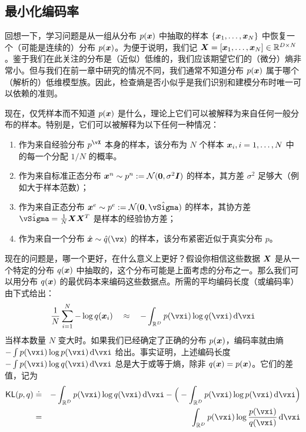 \documentclass[../../book-main.tex]{subfiles}
\begin{document}
\subsection{最小化编码率}\label{sub:min_entropy}
回想一下，学习问题是从一组从分布 $p(\bm{x})$ 中抽取的样本 $\{\bm{x}_1, \ldots, \bm{x}_N\}$ 中恢复一个（可能是连续的）分布 $p(\bm{x})$。为便于说明，我们记 $\bm{X} = [\bm{x}_1, \ldots, \bm{x}_N] \in \mathbb{R}^{D\times N}$。鉴于我们在此关注的分布是（近似）低维的，我们应该期望它们的（微分）熵非常小。但与我们在前一章中研究的情况不同，我们通常不知道分布 $p(\bm{x})$ 属于哪个（解析的）低维模型族。因此，检查熵是否小似乎是我们识别和建模分布时唯一可以依赖的准则。

现在，仅凭样本而不知道 $p(\bm{x})$ 是什么，理论上它们可以被解释为来自任何一般分布的样本。特别是，它们可以被解释为以下任何一种情况：
\begin{enumerate}
	\item 作为来自经验分布 $p^{\vX}$ 本身的样本，该分布为 $N$ 个样本 $\bm{x}_i, i=1, \ldots, N$ 中的每一个分配 $1/N$ 的概率。
	\item 作为来自标准正态分布 $\bm{x}^n \sim p^{n} := \mathcal{N}(\boldsymbol{0}, \sigma^2 \boldsymbol{I})$ 的样本，其方差 $\sigma^2$ 足够大（例如大于样本范数）；
	\item 作为来自正态分布 $\x^e \sim p^{e} := \mathcal{N}(\boldsymbol{0}, \hat{\vSigma})$ 的样本，其协方差 $\hat{\vSigma} = \frac{1}{N} \X \X^T$ 是样本的经验协方差；
	\item 作为来自一个分布 $\hat \x \sim \hat{q}(\vx)$ 的样本，该分布紧密近似于真实分布 $p$。
\end{enumerate}
现在的问题是，哪一个更好，在什么意义上更好？假设你相信这些数据 $\bm{X}$ 是从一个特定的分布 $q(\bm{x})$ 中抽取的，这个分布可能是上面考虑的分布之一。那么我们可以用分布 $q(\bm{x})$ 的最优码本来编码这些数据点。所需的平均编码长度（或编码率）由下式给出：
\begin{equation}
	\frac{1}{N}\sum_{i=1}^N -\log q(\x_i) \quad \approx \quad - \int_{\R^{D}} p(\vxi) \log q(\vxi)\odif{\vxi}
\end{equation}
当样本数量 $N$ 变大时。如果我们已经确定了正确的分布 $p(\bm{x})$，编码率就由熵 $- \int p(\vxi) \log p(\vxi) \odif{\vxi}$ 给出。事实证明，上述编码长度 $- \int p(\vxi) \log q(\vxi) \odif{\vxi}$ 总是大于或等于熵，除非 $q(\bm{x}) = p(\bm{x})$。它们的差值，记为
\begin{eqnarray}
	\KL(p, q) &\doteq& - \int_{\R^{D}} p(\vxi) \log q(\vxi) \odif{\vxi}  - \Big(- \int_{\R^{D}} p(\vxi) \log p(\vxi) \odif{\vxi} \Big)\\
	&=& \int_{\R^{D}} p(\vxi) \log \frac{p(\vxi)}{q(\vxi)} \odif{\vxi}
\end{eqnarray}
\end{document}
